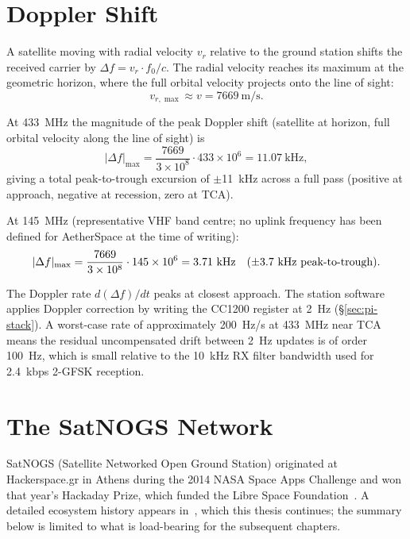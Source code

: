 \section{Doppler Shift}
\label{sec:doppler}

A satellite moving with radial velocity $v_r$ relative to the ground station shifts the received carrier by $\Delta f = v_r \cdot f_0 / c$. The radial velocity reaches its maximum at the geometric horizon, where the full orbital velocity projects onto the line of sight:
\begin{equation}
    v_{r,\max} \approx v = 7669~\text{m/s}.
\end{equation}

At 433~MHz the magnitude of the peak Doppler shift (satellite at horizon, full orbital velocity along the line of sight) is
\begin{equation}
    |\Delta f|_{\max} = \frac{7669}{3 \times 10^8} \cdot 433 \times 10^6 = 11.07~\text{kHz},
\end{equation}
giving a total peak-to-trough excursion of $\pm$11~kHz across a full pass (positive at approach, negative at recession, zero at TCA).

At 145~MHz (representative VHF band centre; no uplink frequency has been defined for AetherSpace at the time of writing):
\begin{equation}
    |\Delta f|_{\max} = \frac{7669}{3 \times 10^8} \cdot 145 \times 10^6 = 3.71~\text{kHz} \quad (\pm 3.7~\text{kHz peak\text{-}to\text{-}trough}).
\end{equation}

The Doppler rate $d(\Delta f)/dt$ peaks at closest approach. The station software applies Doppler correction by writing the CC1200  register at 2~Hz (\S\ref{sec:pi-stack}). A worst-case rate of approximately 200~Hz/s at 433~MHz near TCA means the residual uncompensated drift between 2~Hz updates is of order 100~Hz, which is small relative to the 10~kHz RX filter bandwidth used for 2.4~kbps 2-GFSK reception.

\section{The SatNOGS Network}
\label{sec:satnogs}

SatNOGS (Satellite Networked Open Ground Station) originated at Hackerspace.gr in Athens during the 2014 NASA Space Apps Challenge and won that year's Hackaday Prize, which funded the Libre Space Foundation~\cite{satnogs-main}. A detailed ecosystem history appears in~\cite{hanssens2023}, which this thesis continues; the summary below is limited to what is load-bearing for the subsequent chapters.

